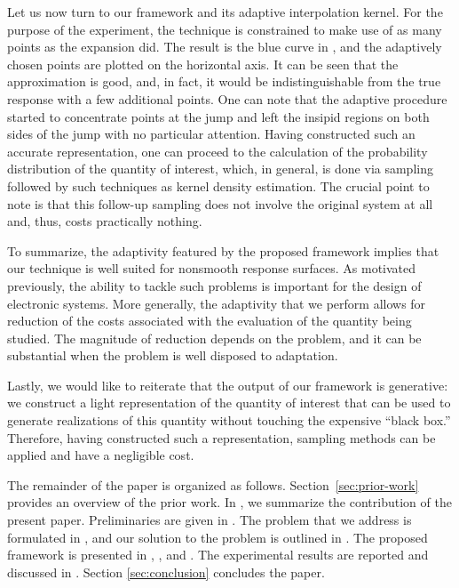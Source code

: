 Let us now turn to our framework and its adaptive interpolation kernel. For the
purpose of the experiment, the technique is constrained to make use of as many
points as the  expansion did. The result is the blue curve in
, and the adaptively chosen points are plotted on the
horizontal axis. It can be seen that the approximation is good, and, in fact, it
would be indistinguishable from the true response with a few additional points.
One can note that the adaptive procedure started to concentrate points at the
jump and left the insipid regions on both sides of the jump with no particular
attention. Having constructed such an accurate representation, one can proceed
to the calculation of the probability distribution of the quantity of interest,
which, in general, is done via sampling followed by such techniques as kernel
density estimation. The crucial point to note is that this follow-up sampling
does not involve the original system at all and, thus, costs practically
nothing.

To summarize, the adaptivity featured by the proposed framework implies that our
technique is well suited for nonsmooth response surfaces. As motivated
previously, the ability to tackle such problems is important for the design of
electronic systems. More generally, the adaptivity that we perform allows for
reduction of the costs associated with the evaluation of the quantity being
studied. The magnitude of reduction depends on the problem, and it can be
substantial when the problem is well disposed to adaptation.

Lastly, we would like to reiterate that the output of our framework is
generative: we construct a light representation of the quantity of interest that
can be used to generate realizations of this quantity without touching the
expensive ``black box.'' Therefore, having constructed such a representation,
sampling methods can be applied and have a negligible cost.

The remainder of the paper is organized as follows. Section~\ref{sec:prior-work}
provides an overview of the prior work. In , we summarize the
contribution of the present paper. Preliminaries are given in
. The problem that we address is formulated in
, and our solution to the problem is outlined in .
The proposed framework is presented in , ,
and . The experimental results are reported and discussed in
. Section \ref{sec:conclusion} concludes the paper.
